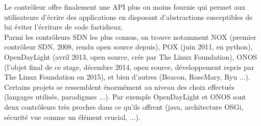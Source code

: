 Le contrôleur offre finalement une API plus ou moins fournie qui permet aux utilisateurs d'écrire des applications en disposant d'abstractions susceptibles de lui éviter l'écriture de code fastidieux.\\

Parmi les contrôleurs SDN les plus connus, on trouve notamment NOX (premier contrôleur SDN, 2008, rendu open source depuis), POX (juin 2011, en python), OpenDayLight (avril 2013, open source, crée par The Linux Foundation), ONOS (l'objet final de ce stage, décembre 2014, open source, développement repris par The Linux Foundation en 2015), et bien d'autres (Beacon, RoseMary, Ryu ...). Certains projets se ressemblent énormément au niveau des choix effectués (langages utilisés, paradigmes ...). Par exemple OpenDayLight et ONOS sont deux contrôleurs très proches dans ce qu'ils offrent (java, architecture OSGi, sécurité vue comme un élément crucial, ...).